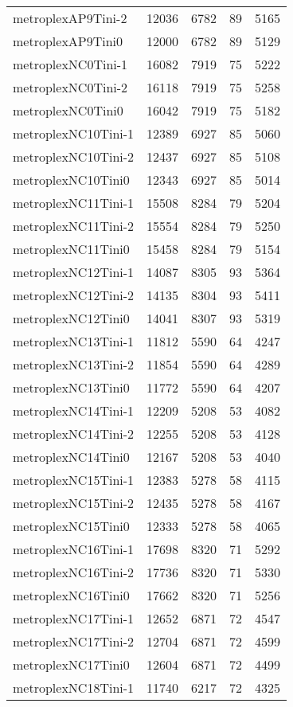 \documentclass[../../../thesis.tex]{subfiles}
\begin{document}
\begin{longtable}{lrrrr}
metroplexAP9Tini-2 & 12036 & 6782 & 89 & 5165 \\
metroplexAP9Tini0 & 12000 & 6782 & 89 & 5129 \\
metroplexNC0Tini-1 & 16082 & 7919 & 75 & 5222 \\
metroplexNC0Tini-2 & 16118 & 7919 & 75 & 5258 \\
metroplexNC0Tini0 & 16042 & 7919 & 75 & 5182 \\
metroplexNC10Tini-1 & 12389 & 6927 & 85 & 5060 \\
metroplexNC10Tini-2 & 12437 & 6927 & 85 & 5108 \\
metroplexNC10Tini0 & 12343 & 6927 & 85 & 5014 \\
metroplexNC11Tini-1 & 15508 & 8284 & 79 & 5204 \\
metroplexNC11Tini-2 & 15554 & 8284 & 79 & 5250 \\
metroplexNC11Tini0 & 15458 & 8284 & 79 & 5154 \\
metroplexNC12Tini-1 & 14087 & 8305 & 93 & 5364 \\
metroplexNC12Tini-2 & 14135 & 8304 & 93 & 5411 \\
metroplexNC12Tini0 & 14041 & 8307 & 93 & 5319 \\
metroplexNC13Tini-1 & 11812 & 5590 & 64 & 4247 \\
metroplexNC13Tini-2 & 11854 & 5590 & 64 & 4289 \\
metroplexNC13Tini0 & 11772 & 5590 & 64 & 4207 \\
metroplexNC14Tini-1 & 12209 & 5208 & 53 & 4082 \\
metroplexNC14Tini-2 & 12255 & 5208 & 53 & 4128 \\
metroplexNC14Tini0 & 12167 & 5208 & 53 & 4040 \\
metroplexNC15Tini-1 & 12383 & 5278 & 58 & 4115 \\
metroplexNC15Tini-2 & 12435 & 5278 & 58 & 4167 \\
metroplexNC15Tini0 & 12333 & 5278 & 58 & 4065 \\
metroplexNC16Tini-1 & 17698 & 8320 & 71 & 5292 \\
metroplexNC16Tini-2 & 17736 & 8320 & 71 & 5330 \\
metroplexNC16Tini0 & 17662 & 8320 & 71 & 5256 \\
metroplexNC17Tini-1 & 12652 & 6871 & 72 & 4547 \\
metroplexNC17Tini-2 & 12704 & 6871 & 72 & 4599 \\
metroplexNC17Tini0 & 12604 & 6871 & 72 & 4499 \\
metroplexNC18Tini-1 & 11740 & 6217 & 72 & 4325 \\

\end{longtable}
\end{document}

